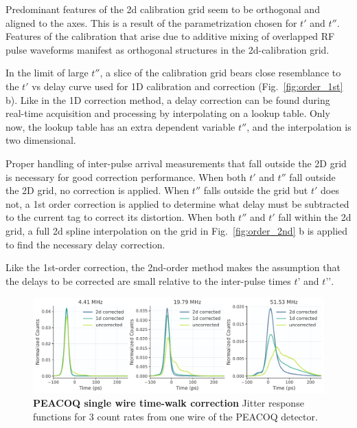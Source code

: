 \documentclass[11pt]{caltech_thesis} %
\begin{document}
Predominant features of the 2d calibration grid seem to be orthogonal and aligned to the axes. This is a result of the parametrization chosen for $t'$ and $t''$. Features of the calibration that arise due to additive mixing of overlapped RF pulse waveforms manifest as orthogonal structures in the 2d-calibration grid.

In the limit of large $t''$, a slice of the calibration grid bears close resemblance to the $t'$ vs delay curve used for 1D calibration and correction (Fig.~\ref{fig:order_1st} b). Like in the 1D correction method, a delay correction can be found during real-time acquisition and processing by interpolating on a lookup table. Only now, the lookup table has an extra dependent variable $t''$, and the interpolation is two dimensional.

Proper handling of inter-pulse arrival measurements that fall outside the 2D grid is necessary for good correction performance. When both $t'$ and $t''$ fall outside the 2D grid, no correction is applied. When $t''$ falls outside the grid but $t'$ does not, a 1st order correction is applied to determine what delay must be subtracted to the current tag to correct its distortion. When both $t''$ and $t'$ fall within the 2d grid, a full 2d spline interpolation on the grid in Fig.~\ref{fig:order_2nd} b is applied to find the necessary delay correction.

Like the 1st-order correction, the 2nd-order method makes the assumption that the delays to be corrected are small relative to the inter-pulse times $t’$ and $t’’$.

\hypertarget{fig:single_wire_correction}{%
\begin{figure}
\centering
\includegraphics[width=1\textwidth,height=\textheight]{./chapter_03/figs/single_wire_results_light.pdf}
\caption[{PEACOQ single wire time-walk correction}]{\textbf{PEACOQ single wire time-walk correction} Jitter response functions for 3 count rates from one wire of the PEACOQ detector.}
\label{fig:single_wire_correction}
\end{figure}
}
\end{document}
